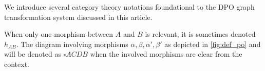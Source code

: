 We introduce several category theory notations foundational to the DPO graph transformation system discussed in this article.















 

 



\begin{remark}
    When only one morphism between \( A \) and \( B \) is relevant, it is sometimes denoted \( h_{AB} \). 
    The diagram involving morphisms \( \alpha, \beta, \alpha', \beta' \) as depicted in \autoref{fig:def_po} and  will be denoted as 
     $\square ACDB$ when the involved morphisms are clear from the context.
\end{remark}  
